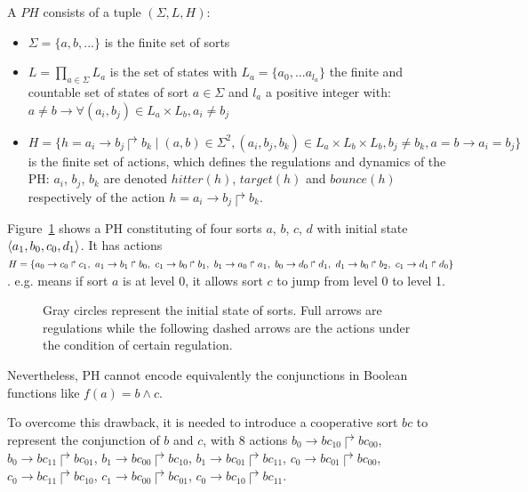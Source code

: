 \begin{definition}
A $PH$ consists of a tuple $(\Sigma, L, H)$:
\begin{itemize}
    \item $\Sigma=\{a,b,...\}$ is the finite set of sorts
    \item $L=\prod_{a\in\Sigma}{L_a}$ is the set of states with $L_a=\{a_0,...a_{l_a}\}$ the finite and countable set of states of sort $a\in\Sigma$ and $l_a$ a positive integer with: $a\neq b\to \forall(a_i,b_j)\in L_a\times L_b,a_i\neq b_j$
    \item $H=\{h=a_i\to b_j\Rsh b_k\mid(a,b)\in\Sigma^2, (a_i,b_j,b_k)\in L_a\times L_b\times L_b,b_j\neq b_k, a=b\to a_i=b_j\}$ is the finite set of actions, which defines the regulations and dynamics of the PH: $a_i$, $b_j$, $b_k$ are denoted $hitter(h)$, $target(h)$ and $bounce(h)$ respectively of the action $h=a_i\to b_j\Rsh b_k$.
\end{itemize}
\end{definition}

\begin{example}
Figure~\ref{fig:PH} shows a PH constituting of four sorts $a$, $b$, $c$, $d$ with initial state $\langle a_1,b_0,c_0,d_1\rangle$. 
It has actions $H=\{\acmph{a_0}{c_0}{c_1},\ \acmph{a_1}{b_1}{b_0},\ \acmph{c_1}{b_0}{b_1},\ \acmph{b_1}{a_0}{a_1},\ \acmph{b_0}{d_0}{d_1},\ \acmph{d_1}{b_0}{b_2},\ \acmph{c_1}{d_1}{d_0}\}$. 
e.g.  means if sort $a$ is at level 0, it allows sort $c$ to jump from level 0 to level 1.
\end{example}

\begin{figure}[ht]
\centering

\caption[Process Hitting]{Gray circles represent the initial state of sorts.
Full arrows are regulations while the following dashed arrows are the actions under the condition of certain regulation.}\label{fig:PH}
\end{figure}

Nevertheless, PH cannot encode equivalently the conjunctions in Boolean functions like $f(a)=b\land c$.

To overcome this drawback, it is needed to introduce a cooperative sort $bc$ to represent the conjunction of $b$ and $c$, with 8 actions $b_0\to bc_{10}\Rsh bc_{00}$, $b_0\to bc_{11}\Rsh bc_{01}$, $b_1\to bc_{00}\Rsh bc_{10}$, $b_1\to bc_{01}\Rsh bc_{11}$, $c_0\to bc_{01}\Rsh bc_{00}$, $c_0\to bc_{11}\Rsh bc_{10}$, $c_1\to bc_{00}\Rsh bc_{01}$, $c_0\to bc_{10}\Rsh bc_{11}$.

